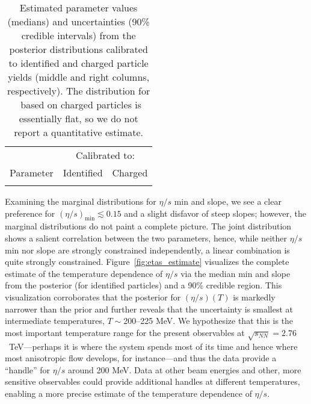 \documentclass[aps,prc,reprint,amsmath,nofootinbib]{revtex4-1}
\newcommand{\sqrts}{\sqrt{s_{NN}}}
\newcommand{\paddedhline}{\noalign{\smallskip}\hline\noalign{\smallskip}}
\begin{document}
\begin{table}[b]
  \caption{
    \label{tab:posterior}
    Estimated parameter values (medians) and uncertainties (90\% credible intervals) from the posterior distributions calibrated to identified and charged particle yields (middle and right columns, respectively).
    The distribution for \Tsw\ based on charged particles is essentially flat, so we do not report a quantitative estimate.
  }
  \begin{ruledtabular}
    \begin{tabular}{lll}
      & \multicolumn{2}{c}{Calibrated to:} \\
      \noalign{\smallskip}\cline{2-3}\noalign{\smallskip}
      Parameter & \multicolumn{1}{c}{Identified} & \multicolumn{1}{c}{Charged} \\
      \paddedhline
      
    \end{tabular}
  \end{ruledtabular}
\end{table}

Examining the marginal distributions for $\eta/s$ min and slope, we see a clear preference for $(\eta/s)_\text{min} \lesssim 0.15$ and a slight disfavor of steep slopes;
however, the marginal distributions do not paint a complete picture.
The joint distribution shows a salient correlation between the two parameters, hence, while neither $\eta/s$ min nor slope are strongly constrained independently, a linear combination is quite strongly constrained.
Figure~\ref{fig:etas_estimate} visualizes the complete estimate of the temperature dependence of $\eta/s$ via the median min and slope from the posterior (for identified particles) and a 90\% credible region.
This visualization corroborates that the posterior for $(\eta/s)(T)$ is markedly narrower than the prior and further reveals that the uncertainty is smallest at intermediate temperatures, $T \sim {}$200--225 MeV.
We hypothesize that this is the most important temperature range for the present observables at $\sqrts = 2.76$~TeV---perhaps it is where the system spends most of its time and hence where most anisotropic flow develops, for instance---and thus the data provide a ``handle'' for $\eta/s$ around 200 MeV.
Data at other beam energies and other, more sensitive observables could provide additional handles at different temperatures, enabling a more precise estimate of the temperature dependence of $\eta/s$.
\end{document}
